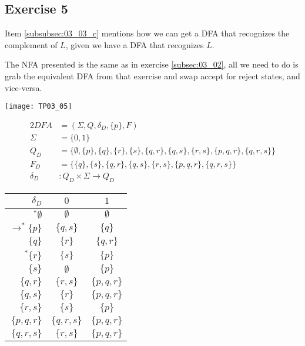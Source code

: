 {\subsection{Exercise 5}
\begin{remark}
	Item \ref{subsubsec:03_03_c} mentions how we can get a DFA that recognizes the complement of $L$, given we have a DFA that recognizes $L$.
\end{remark}
\begin{remark}
	The NFA presented is the same as in exercise \ref{subsec:03_02}, all we need to do is grab the equivalent DFA from that exercise and swap accept for reject states, and vice-versa.
\end{remark}
\begin{center} \texttt{[image: TP03\_05]} \end{center}
\begin{alignat*}{2}
	DFA       &= (\Sigma, Q, \delta_D, \{p\}, F)\\
	\Sigma    &= \{0,1\}\\
	Q_D       &= \{\emptyset,\{p\},\{q\},\{r\},\{s\},\{q,r\},\{q,s\},\{r,s\},\{p,q,r\},\{q,r,s\}\}\\
	F_D       &= \{\{q\},\{s\},\{q,r\},\{q,s\},\{r,s\},\{p,q,r\},\{q,r,s\}\}\\
	\delta_D &\colon Q_D \times \Sigma \rightarrow Q_D
\end{alignat*}
\begin{center}
\begin{tabular}{ r | c c }
 $\delta_D$ & $0$ & $1$ \\
 \hline
 $^\ast \emptyset             $ & $\emptyset  $ & $\emptyset  $ \\
 $\rightarrow^\ast \{p      \}$ & $\{  q,  s\}$ & $\{  q    \}$ \\  
 $                 \{  q    \}$ & $\{    r  \}$ & $\{  q,r  \}$ \\
 $^\ast            \{    r  \}$ & $\{      s\}$ & $\{p      \}$ \\
 $                 \{      s\}$ & $\emptyset  $ & $\{p      \}$ \\
 $                 \{  q,r  \}$ & $\{    r,s\}$ & $\{p,q,r  \}$ \\
 $                 \{  q,  s\}$ & $\{    r  \}$ & $\{p,q,r  \}$ \\
 $                 \{    r,s\}$ & $\{      s\}$ & $\{p      \}$ \\
 $                 \{p,q,r  \}$ & $\{  q,r,s\}$ & $\{p,q,r  \}$ \\
 $                 \{  q,r,s\}$ & $\{    r,s\}$ & $\{p,q,r  \}$
\end{tabular}
\end{center}
\pagebreak
}
